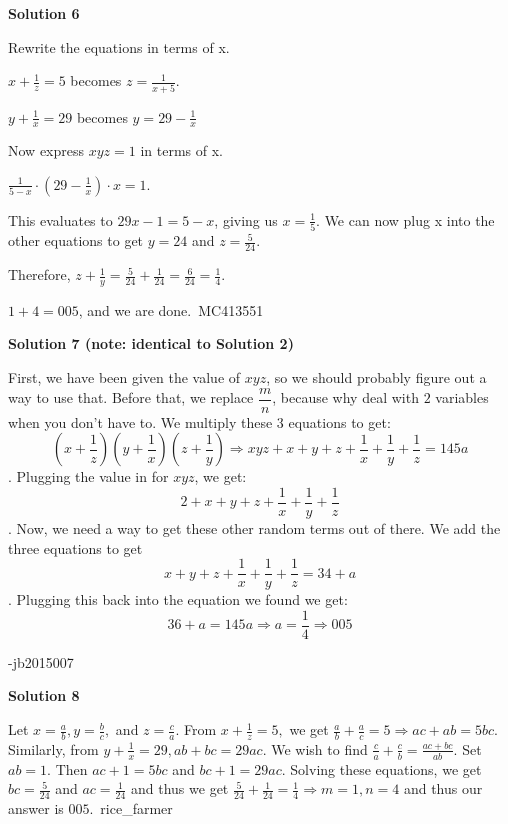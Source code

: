 \begin{enumerate}
\textbf{Solution 6}

Rewrite the equations in terms of x. 

 $x+\frac{1}{z}=5$ becomes $z=\frac{1}{x+5}$. 

 $y+\frac{1}{x}=29$ becomes $y=29-\frac{1}{x}$

 Now express $xyz=1$ in terms of x. 

 $\frac{1}{5-x}\cdot(29-\frac{1}{x})\cdot x=1$.

 This evaluates to $29x-1=5-x$, giving us $x=\frac{1}{5}$. We can now plug x into the other equations to get $y=24$ and $z=\frac{5}{24}$. 

 Therefore, $z+\frac{1}{y}=\frac{5}{24}+\frac{1}{24}=\frac{6}{24}=\frac{1}{4}$. 

 $1+4=\boxed{005}$, and we are done.~MC413551

 



\textbf{Solution 7 (note: identical to Solution 2)}

First, we have been given the value of $xyz$, so we should probably figure out a way to use that. Before that, we replace $\dfrac{m}{n}$, because why deal with $2$ variables when you don't have to. We multiply these $3$ equations to get: 
 \[(x+\dfrac{1}{z})(y+\dfrac{1}{x})(z+\dfrac{1}{y}) \Longrightarrow xyz+x+y+z+\dfrac{1}{x}+\dfrac{1}{y}+\dfrac{1}{z} = 145a\]. Plugging the value in for $xyz$, we get: 
 \[2+x+y+z+\dfrac{1}{x}+\dfrac{1}{y}+\dfrac{1}{z}\]. Now, we need a way to get these other random terms out of there. We add the three equations to get 
 \[x+y+z+\dfrac{1}{x}+\dfrac{1}{y}+\dfrac{1}{z} = 34+a\]. Plugging this back into the equation we found we get: 
 \[36+a = 145a \Longrightarrow a = \dfrac{1}{4} \Longrightarrow \boxed{005}\]

 -jb2015007

 



\textbf{Solution 8}

Let $x=\frac{a}{b},y=\frac{b}{c},$ and $z=\frac{c}{a}.$ From $x+\frac{1}{z}=5,$ we get $\frac{a}{b}+\frac{a}{c}=5\Rightarrow ac+ab=5bc.$ Similarly, from $y+\frac{1}{x}=29,ab+bc=29ac.$ We wish to find $\frac{c}{a}+\frac{c}{b}=\frac{ac+bc}{ab}.$ Set $ab=1.$ Then $ac+1=5bc$ and $bc+1=29ac.$ Solving these equations, we get $bc=\frac{5}{24}$ and $ac=\frac{1}{24}$ and thus we get $\frac{5}{24}+\frac{1}{24}=\frac{1}{4}\Rightarrow m=1,n=4$ and thus our answer is $\boxed{005}.$~rice\_farmer

 



\end{enumerate}
